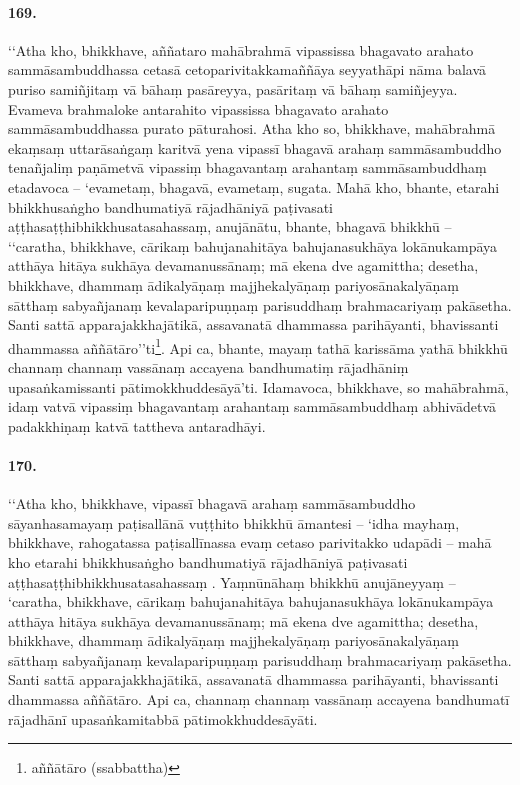 \paragraph{169.} ‘‘Atha kho, bhikkhave, aññataro mahābrahmā vipassissa bhagavato arahato sammāsambuddhassa cetasā cetoparivitakkamaññāya seyyathāpi nāma balavā puriso samiñjitaṃ vā bāhaṃ pasāreyya, pasāritaṃ vā bāhaṃ samiñjeyya. Evameva brahmaloke antarahito vipassissa bhagavato arahato sammāsambuddhassa purato pāturahosi. Atha kho so, bhikkhave, mahābrahmā ekaṃsaṃ uttarāsaṅgaṃ karitvā yena vipassī bhagavā arahaṃ sammāsambuddho tenañjaliṃ paṇāmetvā vipassiṃ bhagavantaṃ arahantaṃ sammāsambuddhaṃ etadavoca – ‘evametaṃ, bhagavā, evametaṃ, sugata. Mahā kho, bhante, etarahi bhikkhusaṅgho bandhumatiyā rājadhāniyā paṭivasati aṭṭhasaṭṭhibhikkhusatasahassaṃ, anujānātu, bhante, bhagavā bhikkhū – ‘‘caratha, bhikkhave, cārikaṃ bahujanahitāya bahujanasukhāya lokānukampāya atthāya hitāya sukhāya devamanussānaṃ; mā ekena dve agamittha; desetha, bhikkhave, dhammaṃ ādikalyāṇaṃ majjhekalyāṇaṃ pariyosānakalyāṇaṃ sātthaṃ sabyañjanaṃ kevalaparipuṇṇaṃ parisuddhaṃ brahmacariyaṃ pakāsetha. Santi sattā apparajakkhajātikā, assavanatā dhammassa parihāyanti, bhavissanti dhammassa aññātāro’’ti\footnote{aññātāro (ssabbattha)}. Api ca, bhante, mayaṃ tathā karissāma yathā bhikkhū channaṃ channaṃ vassānaṃ accayena bandhumatiṃ rājadhāniṃ upasaṅkamissanti pātimokkhuddesāyā’ti. Idamavoca, bhikkhave, so mahābrahmā, idaṃ vatvā vipassiṃ bhagavantaṃ arahantaṃ sammāsambuddhaṃ abhivādetvā padakkhiṇaṃ katvā tattheva antaradhāyi.

\paragraph{170.} ‘‘Atha kho, bhikkhave, vipassī bhagavā arahaṃ sammāsambuddho sāyanhasamayaṃ paṭisallānā vuṭṭhito bhikkhū āmantesi – ‘idha mayhaṃ, bhikkhave, rahogatassa paṭisallīnassa evaṃ cetaso parivitakko udapādi – mahā kho etarahi bhikkhusaṅgho bandhumatiyā rājadhāniyā paṭivasati aṭṭhasaṭṭhibhikkhusatasahassaṃ . Yaṃnūnāhaṃ bhikkhū anujāneyyaṃ – ‘caratha, bhikkhave, cārikaṃ bahujanahitāya bahujanasukhāya lokānukampāya atthāya hitāya sukhāya devamanussānaṃ; mā ekena dve agamittha; desetha, bhikkhave, dhammaṃ ādikalyāṇaṃ majjhekalyāṇaṃ pariyosānakalyāṇaṃ sātthaṃ sabyañjanaṃ kevalaparipuṇṇaṃ parisuddhaṃ brahmacariyaṃ pakāsetha. Santi sattā apparajakkhajātikā, assavanatā dhammassa parihāyanti, bhavissanti dhammassa aññātāro. Api ca, channaṃ channaṃ vassānaṃ accayena bandhumatī rājadhānī upasaṅkamitabbā pātimokkhuddesāyāti.

